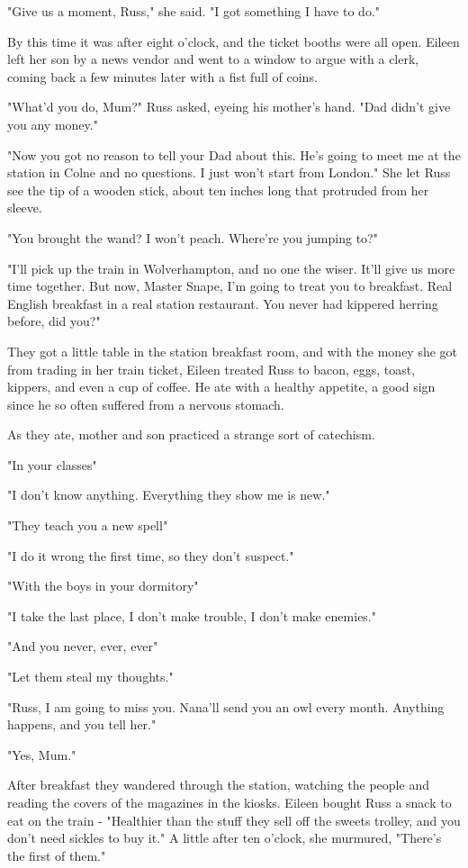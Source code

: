 "Give us a moment, Russ," she said. "I got something I have to do."

By this time it was after eight o'clock, and the ticket booths were all open. Eileen left her son by a news vendor and went to a window to argue with a clerk, coming back a few minutes later with a fist full of coins.

"What'd you do, Mum?" Russ asked, eyeing his mother's hand. "Dad didn't give you any money."

"Now you got no reason to tell your Dad about this. He's going to meet me at the station in Colne and no questions. I just won't start from London." She let Russ see the tip of a wooden stick, about ten inches long that protruded from her sleeve.

"You brought the wand? I won't peach. Where're you jumping to?"

"I'll pick up the train in Wolverhampton, and no one the wiser. It'll give us more time together. But now, Master Snape, I'm going to treat you to breakfast. Real English breakfast in a real station restaurant. You never had kippered herring before, did you?"

They got a little table in the station breakfast room, and with the money she got from trading in her train ticket, Eileen treated Russ to bacon, eggs, toast, kippers, and even a cup of coffee. He ate with a healthy appetite, a good sign since he so often suffered from a nervous stomach.

As they ate, mother and son practiced a strange sort of catechism.

"In your classes{\el}"

"I don't know anything. Everything they show me is new."

"They teach you a new spell{\el}"

"I do it wrong the first time, so they don't suspect."

"With the boys in your dormitory{\el}"

"I take the last place, I don't make trouble, I don't make enemies."

"And you never, ever, ever{\el}"

"Let them steal my thoughts."

"Russ, I am going to miss you. Nana'll send you an owl every month. Anything happens, and you tell her."

"Yes, Mum."

After breakfast they wandered through the station, watching the people and reading the covers of the magazines in the kiosks. Eileen bought Russ a snack to eat on the train - "Healthier than the stuff they sell off the sweets trolley, and you don't need sickles to buy it." A little after ten o'clock, she murmured, "There's the first of them."

